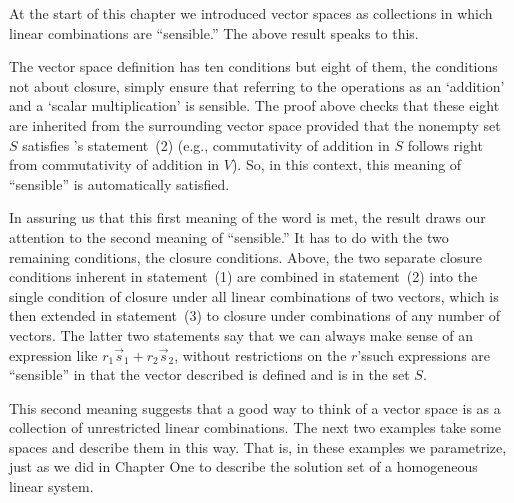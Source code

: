\begin{remark}
At the start of this chapter we introduced vector spaces as collections in
which linear combinations are ``sensible.''
The above result speaks to this.

The vector space definition has ten conditions but eight of them, the
conditions not about closure, simply ensure that referring to the
operations as an `addition' and a `scalar multiplication' is sensible.
The proof above checks that these eight
are inherited from the
surrounding vector space provided that the nonempty set $S$ satisfies
's statement~(2) 
(e.g., commutativity of addition in $S$ follows right from
commutativity of addition in $V$).
So, in this context, this meaning of ``sensible'' is automatically
satisfied.

In assuring us that this first meaning of the word is met, the result draws
our attention to the second meaning of ``sensible.''
It has to do with the two remaining conditions, the closure conditions.
Above, the two separate closure conditions inherent in statement~(1) are
combined in statement~(2) into the single condition of closure under all
linear combinations of two vectors, which is then extended in statement~(3) to
closure under combinations of any number of vectors.
The latter two statements say that we can always make sense of 
an expression like
$r_1\vec{s}_1+r_2\vec{s}_2$, without restrictions on the $r$'s\Dash such 
expressions are ``sensible'' in that the vector described is defined 
and is in the set $S$.

This second meaning suggests that a good way to think of
a vector space is as a collection of unrestricted linear combinations.
The next two examples take some spaces and describe them in this way.
That is, in these examples we parametrize, just as we did in Chapter One 
to describe the solution set of a homogeneous linear system.
\end{remark}

